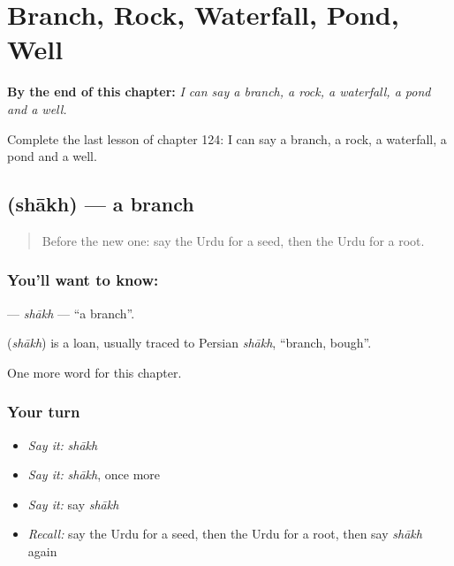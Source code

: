 
\chapter{Branch, Rock, Waterfall, Pond, Well}
\label{ch:ur-branch-rock-waterfall-pond-well}

\begin{chapteropening}
\textbf{By the end of this chapter:} \emph{I can say a branch, a rock, a waterfall, a pond and a well.}

Complete the last lesson of chapter 124: I can say a branch, a rock, a waterfall, a pond and a well.
\end{chapteropening}

\section[\texorpdfstring{\ur{شاخ} (shākh)}{شاخ (shākh)}]{ (shākh) — a branch}

\label{lesson:UR-C124-shakh}



\begin{quote}
Before the new one: say the Urdu for a seed, then the Urdu for a root.
\end{quote}

\subsection*{You'll want to know: }
\textbf{} — \emph{shākh} — \textquotedblleft{}a branch\textquotedblright{}.

\begin{cousinweb}
\textbf{} (\emph{shākh}) is a loan, usually traced to Persian \emph{shākh}, \textquotedblleft{}branch, bough\textquotedblright{}.
\end{cousinweb}

\begin{grammarlens}[title={What you've built}]
One more word for this chapter.
\end{grammarlens}

\subsection*{Your turn}
\begin{itemize}
\raggedright
  \item \emph{Say it:} \emph{shākh}
  \item \emph{Say it:} \emph{shākh}, once more
  \item \emph{Say it:} say \emph{shākh}
  \item \emph{Recall:} say the Urdu for a seed, then the Urdu for a root, then say \emph{shākh} again
\end{itemize}

